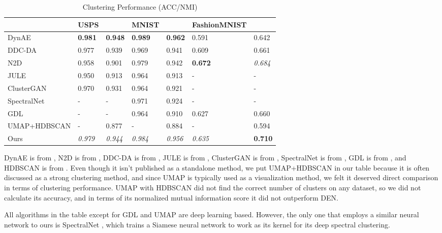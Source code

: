 \documentclass{article}
\begin{document}
\begin{table}[htp]
  \caption{Clustering Performance (ACC/NMI)}
  \label{tab:cluster_results}
  \centering
  \begin{tabular}{lllllll}
    \toprule
& USPS & & MNIST & & FashionMNIST & \\
    \midrule
    DynAE & \textbf{0.981} & \textbf{0.948}  & \textbf{0.989} & \textbf{0.962} & 0.591 & 0.642   \\
    DDC-DA & 0.977 & 0.939 & 0.969 & 0.941 & 0.609 & 0.661 \\
    N2D     & 0.958 & 0.901 & 0.979 &  0.942  & \textbf{0.672} & \textit{0.684}    \\
    JULE     & 0.950 & 0.913 & 0.964 & 0.913 & - & - \\
    ClusterGAN     & 0.970 & 0.931 & 0.964  &  0.921 & - & - \\
    SpectralNet & - & - &  0.971 & 0.924 & - & - \\
    GDL & - & - & 0.964 & 0.910 & 0.627 & 0.660 \\
    UMAP+HDBSCAN & - & 0.877 & - & 0.884 & - & 0.594 \\
    \midrule
    Ours & \textit{0.979} & \textit{0.944} & \textit{0.984} & \textit{0.956} & \textit{0.635} & \textbf{0.710} \\
    \bottomrule
  \end{tabular}
\end{table}

DynAE is from \cite{mrabah2019deep}, N2D is from \cite{mcconville2019n2d}, DDC-DA is from \cite{ren2020deep}, JULE is from \cite{yang2016joint}, ClusterGAN is from \cite{mukherjee2019clustergan}, SpectralNet is from \cite{shaham2018spectralnet}, GDL is from \cite{zhang2012graph}, and HDBSCAN is from \cite{mcinnes2017hdbscan}. Even though it isn't published as a standalone method, we put UMAP+HDBSCAN in our table because it is often discussed as a strong clustering method, and since UMAP is typically used as a visualization method, we felt it deserved direct comparison in terms of clustering performance. UMAP with HDBSCAN did not find the correct number of clusters on any dataset, so we did not calculate its accuracy, and in terms of its normalized mutual information score it did not outperform DEN.

All algorithms in the table except for GDL and UMAP are deep learning based. However, the only one that employs a similar neural network to ours is SpectralNet \cite{shaham2018spectralnet}, which trains a Siamese neural network \cite{koch2015siamese} to work as its kernel for its deep spectral clustering.
\end{document}
